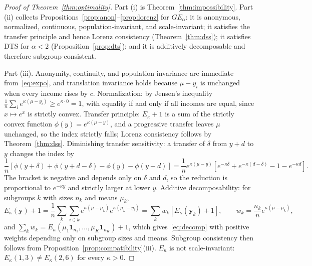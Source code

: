 \documentclass[12pt]{article}
\theoremstyle{plain}
\theoremstyle{definition}
\theoremstyle{remark}
\newcommand{\bfy}{\mathbf{y}}
\newcommand{\bfone}{\mathbf{1}}
\begin{document}
\begin{proof}[Proof of Theorem~\ref{thm:optimality}]
Part (i) is Theorem~\ref{thm:impossibility}.
Part (ii) collects Propositions~\ref{prop:anon}--\ref{prop:lorenz} for $GE_\alpha$: it is anonymous, normalized, continuous, population-invariant, and scale-invariant; it satisfies the transfer principle and hence Lorenz consistency (Theorem~\ref{thm:dss}); it satisfies DTS for $\alpha < 2$ (Proposition~\ref{prop:dts}); and it is additively decomposable and therefore subgroup-consistent.

Part (iii).
Anonymity, continuity, and population invariance are immediate from~\eqref{eq:expo}, and translation invariance holds because $\mu - y_i$ is unchanged when every income rises by $c$.
Normalization: by Jensen's inequality $\frac{1}{n}\sum_i e^{\kappa(\mu - y_i)} \geq e^{\kappa \cdot 0} = 1$, with equality if and only if all incomes are equal, since $x \mapsto e^{x}$ is strictly convex.
Transfer principle: $E_\kappa + 1$ is a sum of the strictly convex function $\phi(y) = e^{\kappa(\mu - y)}$, and a progressive transfer leaves $\mu$ unchanged, so the index strictly falls; Lorenz consistency follows by Theorem~\ref{thm:dss}.
Diminishing transfer sensitivity: a transfer of $\delta$ from $y + d$ to $y$ changes the index by
\[
\frac{1}{n}\left[\phi(y + \delta) + \phi(y + d - \delta) - \phi(y) - \phi(y + d)\right] = \frac{1}{n} e^{\kappa(\mu - y)}\left[e^{-\kappa\delta} + e^{-\kappa(d - \delta)} - 1 - e^{-\kappa d}\right].
\]
The bracket is negative and depends only on $\delta$ and $d$, so the reduction is proportional to $e^{-\kappa y}$ and strictly larger at lower $y$.
Additive decomposability: for subgroups $k$ with sizes $n_k$ and means $\mu_k$,
\[
E_\kappa(\bfy) + 1 = \frac{1}{n}\sum_k \sum_{i \in k} e^{\kappa(\mu - \mu_k)} e^{\kappa(\mu_k - y_i)} = \sum_k w_k \left[E_\kappa(\bfy_k) + 1\right], \qquad w_k = \frac{n_k}{n} e^{\kappa(\mu - \mu_k)},
\]
and $\sum_k w_k = E_\kappa(\mu_1\bfone_{n_1}, \ldots, \mu_K\bfone_{n_K}) + 1$, which gives~\eqref{eq:decomp} with positive weights depending only on subgroup sizes and means.
Subgroup consistency then follows from Proposition~\ref{prop:compatibility}(iii).
$E_\kappa$ is not scale-invariant: $E_\kappa(1, 3) \neq E_\kappa(2, 6)$ for every $\kappa > 0$.
\end{proof}
\end{document}
